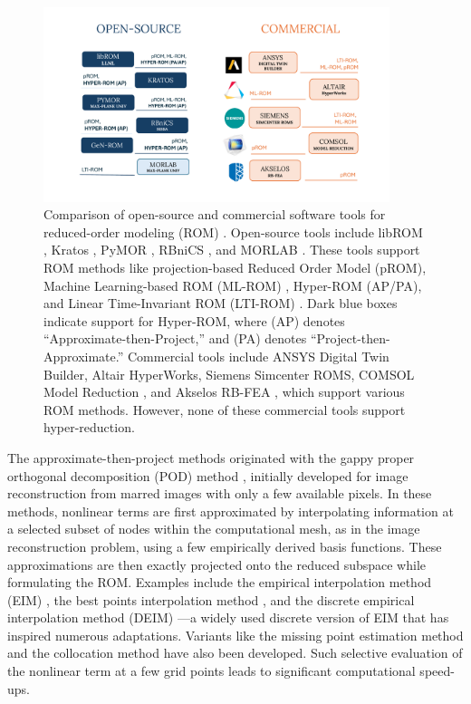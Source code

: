 \documentclass[11pt]{article}
\begin{document}
\begin{figure}[t]
    \centering
    \includegraphics[width=0.9\textwidth]{software_survey5.pdf}
    \caption{Comparison of open-source and commercial software tools for reduced-order modeling (ROM) \protect\footnotemark. Open-source tools include libROM \cite{Choi2019libROM}, Kratos \cite{vicente_mataix_ferrandiz_2022_6395887}, PyMOR \cite{milk2016pymor}, RBniCS \cite{RozzaBallarinScandurraPichi2024}, and MORLAB \cite{BenW21c}. These tools support ROM methods like projection-based Reduced Order Model (pROM), Machine Learning-based ROM (ML-ROM) \cite{Drakoulas_2023,TANNOUS_2024}, Hyper-ROM (AP/PA), and Linear Time-Invariant ROM (LTI-ROM) \cite{Sikander_2017}. Dark blue boxes indicate support for Hyper-ROM, where (AP) denotes ``Approximate-then-Project,'' and (PA) denotes ``Project-then-Approximate.'' Commercial tools include ANSYS Digital Twin Builder, Altair HyperWorks, Siemens Simcenter ROMS, COMSOL Model Reduction \cite{saha2019reduced,deng2021reduced-order,Zhang_2021}, and Akselos RB-FEA \cite{Di_Nicola_2024,Sharma_2018,BRENNER_2023}, which support various ROM methods. However, none of these commercial tools support hyper-reduction.}
    \label{fig:ROM_software}
\end{figure}

The approximate-then-project methods originated with the gappy proper orthogonal decomposition (POD) method \cite{everson1995karhunen--loeve}, initially developed for image reconstruction from marred images with only a few available pixels.
In these methods, nonlinear terms are first approximated by interpolating information at a selected subset of nodes within the computational mesh, as in the image reconstruction problem, using a few empirically derived basis functions.
These approximations are then exactly projected onto the reduced subspace while formulating the ROM.
Examples include the empirical interpolation method (EIM) \cite{Hesthaven2016,barrault2004empirical}, the best points interpolation method \cite{nguyen2007best}, and the discrete empirical interpolation method (DEIM) \cite{chaturantabut2010nonlinear}—a widely used discrete version of EIM that has inspired numerous adaptations.
Variants like the missing point estimation method and the collocation method \cite{astrid2008missing,gomez2016variational} have also been developed.
Such selective evaluation of the nonlinear term at a few grid points leads to significant computational speed-ups.
\end{document}
